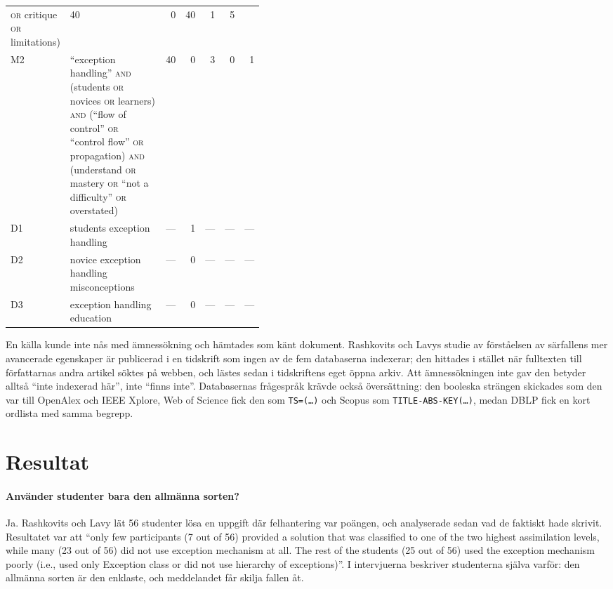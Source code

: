 \begin{table}[htbp]
\begin{tabular}{@{}lp{0.42\linewidth}rrrrr@{}}
      \textsc{or} critique \textsc{or} limitations)
      & 40 & 0 & 40 & 1 & 5 \\
    M2 & \enquote{exception handling} \textsc{and} (students
      \textsc{or} novices \textsc{or} learners) \textsc{and}
      (\enquote{flow of control} \textsc{or} \enquote{control flow}
      \textsc{or} propagation) \textsc{and} (understand \textsc{or}
      mastery \textsc{or} \enquote{not a difficulty} \textsc{or}
      overstated)
      & 40 & 0 & 3 & 0 & 1 \\
    D1 & students exception handling & --- & 1 & --- & --- & --- \\
    D2 & novice exception handling misconceptions
      & --- & 0 & --- & --- & --- \\
    D3 & exception handling education & --- & 0 & --- & --- & --- \\
    \bottomrule
  \end{tabular}
\end{table}

En källa kunde inte nås med ämnessökning och hämtades som känt dokument.
Rashkovits och Lavys studie av förståelsen av särfallens mer avancerade
egenskaper\autocite{RashkovitsLavy2012} är publicerad i en tidskrift som
ingen av de fem databaserna indexerar; den hittades i stället när
fulltexten till författarnas andra artikel söktes på webben, och lästes
sedan i tidskriftens eget öppna arkiv.  Att ämnessökningen inte gav den
betyder alltså \enquote{inte indexerad här}, inte \enquote{finns inte}.
Databasernas frågespråk krävde också översättning: den booleska strängen
skickades som den var till OpenAlex och IEEE Xplore, Web of Science fick
den som \texttt{TS=(\dots)} och Scopus som
\texttt{TITLE-ABS-KEY(\dots)}, medan DBLP fick en kort ordlista med samma
begrepp.

\section{Resultat}
\label{sec:nyb-resultat}

\paragraph{Använder studenter bara den allmänna sorten?}
Ja.  Rashkovits och Lavy lät 56 studenter lösa en uppgift där
felhantering var poängen, och analyserade sedan vad de faktiskt hade
skrivit.  Resultatet var att \enquote{only few participants (7 out of 56)
provided a solution that was classified to one of the two highest
assimilation levels, while many (23 out of 56) did not use exception
mechanism at all.  The rest of the students (25 out of 56) used the
exception mechanism poorly (i.e., used only Exception class or did not
use hierarchy of exceptions)}\autocite[183]{RashkovitsLavy2011}.  I
intervjuerna beskriver studenterna själva varför: den allmänna sorten är
den enklaste, och meddelandet får skilja fallen
åt\autocite[203]{RashkovitsLavy2011}.

